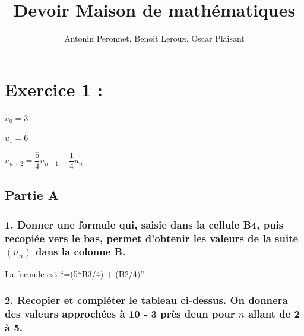 \documentclass[]{scrartcl}
\title{\huge Devoir Maison de mathématiques}
\author{Antonin Peronnet, Benoit Leroux, Oscar Plaisant}
\date{}
\begin{document}
\maketitle

\hypertarget{exercice-1}{%
\section{Exercice 1 :}\label{exercice-1}}

\(u_0 = 3\)

\(u_1 = 6\)

\(u_{n+2} = \dfrac{5}{4}u_{n+1} -\dfrac{1}{4}u_n\)

\hypertarget{partie-a}{%
\subsection{Partie A}\label{partie-a}}

\hypertarget{donner-une-formule-qui-saisie-dans-la-cellule-b4-puis-recopiuxe9e-vers-le-bas-permet-dobtenir-les-valeurs-de-la-suite-u_n-dans-la-colonne-b.}{%
\subsubsection{\texorpdfstring{1. Donner une formule qui, saisie dans la
cellule B4, puis recopiée vers le bas, permet d'obtenir les valeurs de
la suite \((u_n)\) dans la colonne
B.}{1. Donner une formule qui, saisie dans la cellule B4, puis recopiée vers le bas, permet d'obtenir les valeurs de la suite (u\_n) dans la colonne B.}}\label{donner-une-formule-qui-saisie-dans-la-cellule-b4-puis-recopiuxe9e-vers-le-bas-permet-dobtenir-les-valeurs-de-la-suite-u_n-dans-la-colonne-b.}}

La formule est ``=(5*B3/4) + (B2/4)''

\hypertarget{recopier-et-compluxe9ter-le-tableau-ci-dessus.-on-donnera-des-valeurs-approchuxe9es-uxe0-10---3-pruxe8s-deun-pour-n-allant-de-2-uxe0-5.}{%
\subsubsection{\texorpdfstring{2. Recopier et compléter le tableau
ci-dessus. On donnera des valeurs approchées à 10 - 3 près deun pour
\(n\) allant de 2 à
5.}{2. Recopier et compléter le tableau ci-dessus. On donnera des valeurs approchées à 10 - 3 près deun pour n allant de 2 à 5.}}\label{recopier-et-compluxe9ter-le-tableau-ci-dessus.-on-donnera-des-valeurs-approchuxe9es-uxe0-10---3-pruxe8s-deun-pour-n-allant-de-2-uxe0-5.}}
\end{document}
